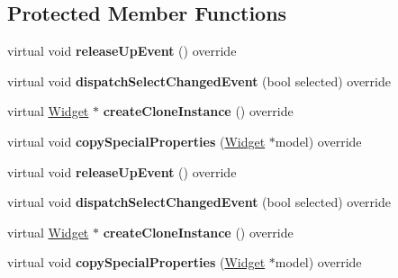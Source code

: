 \subsection*{Protected Member Functions}
\begin{DoxyCompactItemize}
\item 
\mbox{\label{classui_1_1RadioButton_a53e78d8f0ccfcff32f5e026cad1ecdaa}} 
virtual void {\bfseries release\+Up\+Event} () override
\item 
\mbox{\label{classui_1_1RadioButton_a07c913b36d413c0330617756144c8966}} 
virtual void {\bfseries dispatch\+Select\+Changed\+Event} (bool selected) override
\item 
\mbox{\label{classui_1_1RadioButton_a791211e9fba73ffb8bfc5c27c2015149}} 
virtual \hyperlink{classui_1_1Widget}{Widget} $\ast$ {\bfseries create\+Clone\+Instance} () override
\item 
\mbox{\label{classui_1_1RadioButton_af494ba0a693efa86e2aa1652a57c8d17}} 
virtual void {\bfseries copy\+Special\+Properties} (\hyperlink{classui_1_1Widget}{Widget} $\ast$model) override
\item 
\mbox{\label{classui_1_1RadioButton_aa67c2b3eb7e2ae703979a209c988cdf1}} 
virtual void {\bfseries release\+Up\+Event} () override
\item 
\mbox{\label{classui_1_1RadioButton_ab7b0bbaed8d915cdc6bec72d09ae31e5}} 
virtual void {\bfseries dispatch\+Select\+Changed\+Event} (bool selected) override
\item 
\mbox{\label{classui_1_1RadioButton_a194cf5ff4f83aea993b75a6a117b964f}} 
virtual \hyperlink{classui_1_1Widget}{Widget} $\ast$ {\bfseries create\+Clone\+Instance} () override
\item 
\mbox{\label{classui_1_1RadioButton_a24b36bcc3eba9d920d7efde095e08ce8}} 
virtual void {\bfseries copy\+Special\+Properties} (\hyperlink{classui_1_1Widget}{Widget} $\ast$model) override
\end{DoxyCompactItemize}

